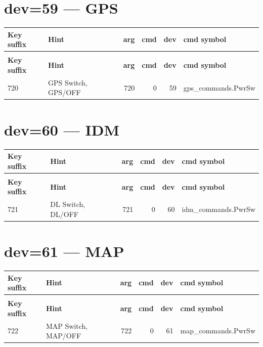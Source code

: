 \documentclass[10pt,a4paper]{article}
\begin{document}
\section{dev=59 — GPS}
\begin{longtable}{>{\ttfamily\small}p{38mm} >{\small}p{72mm} r r r >{\ttfamily\small}p{48mm}}
\toprule
\textbf{Key suffix} & \textbf{Hint} & \textbf{arg} & \textbf{cmd} & \textbf{dev} & \textbf{cmd symbol} \\
\midrule
\endfirsthead
\multicolumn{6}{l}{\small\itshape continued\ldots}\\
\toprule
\textbf{Key suffix} & \textbf{Hint} & \textbf{arg} & \textbf{cmd} & \textbf{dev} & \textbf{cmd symbol} \\
\midrule
\endhead
\bottomrule
\endfoot
\rowcolor{rowodd}
  720 & GPS Switch, GPS/OFF & 720 & 0 & 59 & gps\_commands.PwrSw \\
\end{longtable}
\section{dev=60 — IDM}
\begin{longtable}{>{\ttfamily\small}p{38mm} >{\small}p{72mm} r r r >{\ttfamily\small}p{48mm}}
\toprule
\textbf{Key suffix} & \textbf{Hint} & \textbf{arg} & \textbf{cmd} & \textbf{dev} & \textbf{cmd symbol} \\
\midrule
\endfirsthead
\multicolumn{6}{l}{\small\itshape continued\ldots}\\
\toprule
\textbf{Key suffix} & \textbf{Hint} & \textbf{arg} & \textbf{cmd} & \textbf{dev} & \textbf{cmd symbol} \\
\midrule
\endhead
\bottomrule
\endfoot
\rowcolor{rowodd}
  721 & DL Switch, DL/OFF & 721 & 0 & 60 & idm\_commands.PwrSw \\
\end{longtable}
\section{dev=61 — MAP}
\begin{longtable}{>{\ttfamily\small}p{38mm} >{\small}p{72mm} r r r >{\ttfamily\small}p{48mm}}
\toprule
\textbf{Key suffix} & \textbf{Hint} & \textbf{arg} & \textbf{cmd} & \textbf{dev} & \textbf{cmd symbol} \\
\midrule
\endfirsthead
\multicolumn{6}{l}{\small\itshape continued\ldots}\\
\toprule
\textbf{Key suffix} & \textbf{Hint} & \textbf{arg} & \textbf{cmd} & \textbf{dev} & \textbf{cmd symbol} \\
\midrule
\endhead
\bottomrule
\endfoot
\rowcolor{rowodd}
  722 & MAP Switch, MAP/OFF & 722 & 0 & 61 & map\_commands.PwrSw \\
\end{longtable}
\end{document}
